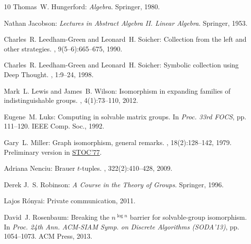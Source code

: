 \documentclass[11pt]{article}
\numberwithin{equation}{section}
\theoremstyle{definition}
\theoremstyle{plain}
\numberwithin{equation}{section}
\theoremstyle{plain}       %
\theoremstyle{remark}
\theoremstyle{definition}
\numberwithin{figure}{section}
\numberwithin{table}{section}
\begin{document}
\begin{thebibliography}{10}
{\sc Thomas~W. Hungerford}: {\em Algebra}.
\newblock Springer, 1980.
\newblock [\epfmtdoi{10.1007/978-1-4612-6101-8}]

{\sc Nathan Jacobson}: {\em Lectures in Abstract Algebra II. Linear Algebra}.
\newblock Springer, 1953.
\newblock [\epfmtdoi{10.1007/978-1-4684-7053-6}]

{\sc Charles~R. Leedham-Green and Leonard~H. Soicher}: Collection from the left
  and other strategies.
, 9(5--6):665--675, 1990.
\newblock [\epfmtdoi{10.1016/S0747-7171(08)80081-8}]

{\sc Charles~R. Leedham-Green and Leonard~H. Soicher}: Symbolic collection
  using {D}eep {T}hought.
, 1:9--24, 1998.
\newblock [\epfmtdoi{10.1112/S1461157000000127}]

{\sc Mark~L. Lewis and James~B. Wilson}: Isomorphism in expanding families of
  indistinguishable groups.
, 4(1):73--110, 2012.

{\sc Eugene~M. Luks}: Computing in solvable matrix groups.
\newblock In {\em Proc. 33rd FOCS}, pp. 111--120. IEEE Comp. Soc., 1992.

{\sc Gary~L. Miller}: Graph isomorphism, general remarks.
, 18(2):128--142, 1979.
\newblock Preliminary version in
  \href{https://doi.org/10.1145/800105.803404}{STOC'77}.
\newblock [\epfmtdoi{10.1016/0022-0000(79)90043-6}]

{\sc Adriana Nenciu}: Brauer $t$-tuples.
, 322(2):410--428, 2009.

{\sc Derek J.~S. Robinson}: {\em A Course in the Theory of Groups}.
\newblock Springer, 1996.
\newblock [\epfmtdoi{10.1007/978-1-4419-8594-1}]

{\sc Lajos R{\'o}nyai}: Private communication, 2011.

{\sc David~J. Rosenbaum}: Breaking the $n^{\log n}$ barrier for solvable-group
  isomorphism.
\newblock In {\em Proc. 24th Ann. ACM-SIAM Symp. on Discrete Algorithms
  (SODA'13)}, pp. 1054--1073. ACM Press, 2013.


\end{thebibliography}
\end{document}
